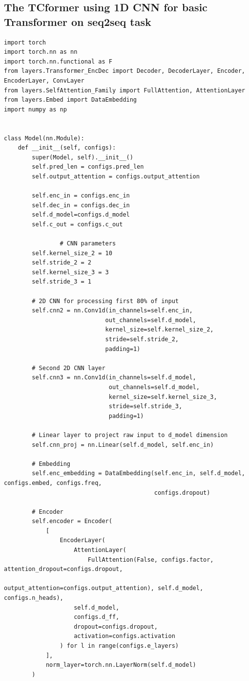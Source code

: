 \documentclass[stu,12pt,floatsintext]{apa7}
\begin{document}
\subsection{The TCformer using 1D CNN for basic Transformer on seq2seq task}
\begin{verbatim}
import torch
import torch.nn as nn
import torch.nn.functional as F
from layers.Transformer_EncDec import Decoder, DecoderLayer, Encoder, EncoderLayer, ConvLayer
from layers.SelfAttention_Family import FullAttention, AttentionLayer
from layers.Embed import DataEmbedding
import numpy as np


class Model(nn.Module):
    def __init__(self, configs):
        super(Model, self).__init__()
        self.pred_len = configs.pred_len
        self.output_attention = configs.output_attention

        self.enc_in = configs.enc_in
        self.dec_in = configs.dec_in
        self.d_model=configs.d_model
        self.c_out = configs.c_out
        
                # CNN parameters
        self.kernel_size_2 = 10
        self.stride_2 = 2
        self.kernel_size_3 = 3
        self.stride_3 = 1

        # 2D CNN for processing first 80% of input
        self.cnn2 = nn.Conv1d(in_channels=self.enc_in,
                             out_channels=self.d_model,
                             kernel_size=self.kernel_size_2,
                             stride=self.stride_2,
                             padding=1)
        
        # Second 2D CNN layer
        self.cnn3 = nn.Conv1d(in_channels=self.d_model,
                              out_channels=self.d_model,
                              kernel_size=self.kernel_size_3,
                              stride=self.stride_3,
                              padding=1)

        # Linear layer to project raw input to d_model dimension
        self.cnn_proj = nn.Linear(self.d_model, self.enc_in)

        # Embedding
        self.enc_embedding = DataEmbedding(self.enc_in, self.d_model, configs.embed, configs.freq,
                                           configs.dropout)

        # Encoder
        self.encoder = Encoder(
            [
                EncoderLayer(
                    AttentionLayer(
                        FullAttention(False, configs.factor, attention_dropout=configs.dropout,
                                      output_attention=configs.output_attention), self.d_model, configs.n_heads),
                    self.d_model,
                    configs.d_ff,
                    dropout=configs.dropout,
                    activation=configs.activation
                ) for l in range(configs.e_layers)
            ],
            norm_layer=torch.nn.LayerNorm(self.d_model)
        )


\end{verbatim}
\end{document}
